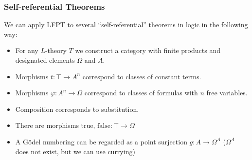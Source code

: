 \documentclass{beamer}
\begin{document}
\begin{frame}
  \frametitle{Self-referential Theorems}
  We can apply LFPT to several ``self-referential'' theorems in logic in the following way:
  \begin{itemize}
    \item For any $L$-theory $T$ we construct a category with finite products and designated elements $\Omega$ and $A$.
    \item Morphisms $t : \top \rightarrow A^n$ correspond to classes of constant terms.
    \item Morphisms $\varphi : A^n \rightarrow \Omega$ correspond to classes of formulas with $n$ free variables.
    \item Composition corresponds to substitution.
    \item There are morphisms $\text{true, false} : \top \rightarrow \Omega$
    \item A Gödel numbering can be regarded as a point surjection $g : A \rightarrow \Omega ^ A$ ($\Omega ^ A$ does not exist, but we can use currying)
  \end{itemize}
\end{frame}
\end{document}
